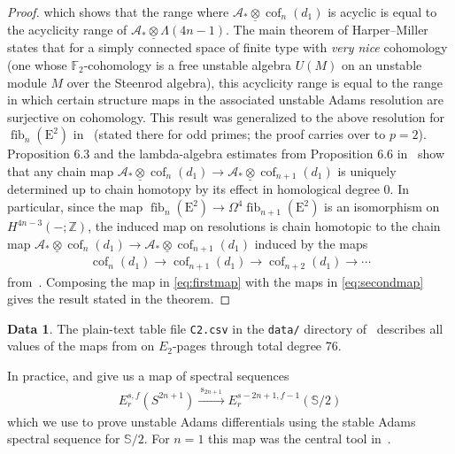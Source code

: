 \documentclass[dvipsnames,table]{amsart}
\theoremstyle{definition}
\newtheorem{data}[theorem]{Data}
\theoremstyle{remark}
\numberwithin{equation}{section}
\begin{document}
\begin{proof}
which shows that the range where $\mathcal{A}_* \underline{\otimes} \operatorname{cof}_n(d_1)$ is acyclic is equal to the acyclicity range of $\mathcal{A}_* \underline{\otimes} \Lambda(4n - 1)$. The main theorem of Harper--Miller~\cite[Theorem~3.9]{Harper_Miller_1989} states that for a simply connected space of finite type with \emph{very nice} cohomology (one whose $\mathbb{F}_2$-cohomology is a free unstable algebra $U(M)$ on an unstable module $M$ over the Steenrod algebra), this acyclicity range is equal to the range in which certain structure maps in the associated unstable Adams resolution are surjective on cohomology. This result was generalized to the above resolution for $\operatorname{fib}_n(\mathrm{E}^2)$ in~\cite[Proposition~2.26]{Thompson_1990} (stated there for odd primes; the proof carries over to $p = 2$). Proposition 6.3 and the lambda-algebra estimates from Proposition 6.6 in~\cite{Mahowald_Thompson_1994} show that any chain map $\mathcal{A}_* \underline{\otimes} \operatorname{cof}_n(d_1) \to \mathcal{A}_* \underline{\otimes} \operatorname{cof}_{n+1}(d_1)$ is uniquely determined up to chain homotopy by its effect in homological degree $0$. In particular, since the map $\operatorname{fib}_n(\mathrm{E}^2) \to \Omega^4\operatorname{fib}_{n+1}(\mathrm{E}^2)$ is an isomorphism on $H^{4n - 3}(-;\mathbb{Z})$, the induced map on resolutions is chain homotopic to the chain map $\mathcal{A}_* \underline{\otimes} \operatorname{cof}_n(d_1) \to \mathcal{A}_* \underline{\otimes} \operatorname{cof}_{n+1}(d_1)$ induced by the maps 
\begin{equation}
\label{eq:secondmap}
\begin{aligned}
  \operatorname{cof}_n(d_1) \to  \operatorname{cof}_{n+1}(d_1) \to  \operatorname{cof}_{n+2}(d_1) \to \cdots
\end{aligned}
\end{equation}
from~\cite[Definition~3.2]{Mahowald_1975}. Composing the map in \eqref{eq:firstmap} with the maps in \eqref{eq:secondmap} gives the result stated in the theorem.






\end{proof}
\begin{data}
  \label{data:C2-comp}
  The plain-text table file \texttt{C2.csv} in the \texttt{data/} directory of~\cite{ehpreprint_data} describes all values of the maps from  on $E_2$-pages through total degree 76.
\end{data}
\noindent In practice,  and  give us a map of spectral sequences
\begin{equation}
\label{eq:der}
\begin{aligned}
  E_r^{s, f}(S^{2n + 1}) \xrightarrow{\;\mathrm{s}_{2n+1}\;} E_r^{s - 2n + 1, f - 1}(\mathbb{S}/2)
\end{aligned}
\end{equation}
which we use to prove unstable Adams differentials using the stable Adams
spectral sequence for $\mathbb{S}/2$. For $n = 1$ this map was the central tool in~\cite{Curtis_Mahowald_1989}.
\end{document}
